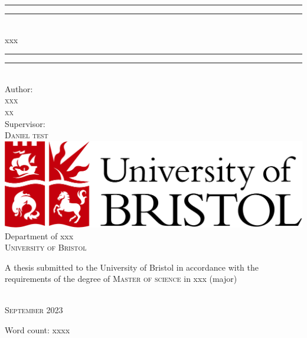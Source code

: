 \begin{titlepage}

\vspace*{13mm}

\begin{center}
\rule[0.5ex]{\linewidth}{2pt}\vspace*{-\baselineskip}\vspace*{3.2pt}
\rule[0.5ex]{\linewidth}{1pt}\\[\baselineskip]
{\LARGE xxx}\\[4mm]
\rule[0.5ex]{\linewidth}{1pt}\vspace*{-\baselineskip}\vspace{3.2pt}
\rule[0.5ex]{\linewidth}{2pt}\\

\vspace{6.5mm}
{\large Author: \\
\textsc{xxx}\\
\textsc{xx}}\\

\vspace{6.5mm}
{\large Supervisor: \\
\textsc{Daniel test }}\\

\vspace{11mm}
\includegraphics[scale=0.2]{logos/bristollogo_colour}\\
\vspace{6mm}
{\large Department of xxx\\
\vspace{6mm}
\textsc{University of Bristol}}\\
\vspace{6mm}
\begin{minipage}{10cm}
A thesis submitted to the University of Bristol in accordance with the requirements of the degree of \textsc{Master of science} in xxx (major)
\end{minipage}\\
\vspace{11mm}
{\large\textsc{September 2023}}
\vspace{11mm}
\end{center}

\begin{flushright}
{\small Word count: xxxx}
\end{flushright}

\end{titlepage}